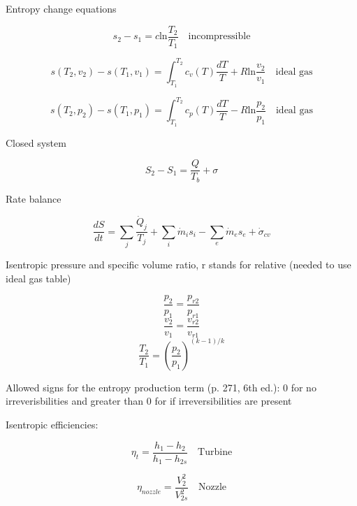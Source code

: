 \documentclass[paper=letter, fontsize=11pt]{scrartcl}
\numberwithin{equation}{section}        %
\numberwithin{figure}{section}          %
\numberwithin{table}{section}               %
\begin{document}
Entropy change equations

\begin{equation}
    s_2-s_1 = c \text{ln}\frac{T_2}{T_1}\quad\text{incompressible}
\end{equation}

\begin{equation}
    s(T_2,v_2)-s(T_1,v_1) = \int_{T_1}^{T_2}c_v(T)\frac{dT}{T} + R \text{ln}\frac{v_2}{v_1}  \quad\text{ideal gas}
\end{equation}

\begin{equation}
    s(T_2,p_2)-s(T_1,p_1) = \int_{T_1}^{T_2}c_p(T)\frac{dT}{T} - R \text{ln}\frac{p_2}{p_1}  \quad\text{ideal gas}
\end{equation}

Closed system

\begin{equation}
    S_2-S_1 = \frac{Q}{T_b}+\sigma
\end{equation}

Rate balance

\begin{equation}
    \frac{dS}{dt} = \sum_j \frac{\dot Q_j}{T_j} + \sum_i \dot m_i s_i - \sum_e \dot m_e s_e +\dot\sigma_{cv}
\end{equation}

Isentropic pressure and specific volume ratio, r stands for relative (needed to use ideal gas table)

\begin{equation}
    \frac{p_2}{p_1}=\frac{p_{r2}}{p_{r1}}
\end{equation}
\begin{equation}
    \frac{v_2}{v_1}=\frac{v_{r2}}{v_{r1}}
\end{equation}
\begin{equation}
    \frac{T_2}{T_1} = \left(\frac{p_2}{p_1}\right)^{(k-1)/k}
\end{equation}

Allowed signs for the entropy production term (p. 271, 6th ed.): 0 for no irreverisbilities and greater than 0 for if irreversibilities are present

Isentropic efficiencies:

\begin{equation}
    \eta_t = \frac{h_1 - h_2}{h_1 - h_{2s}}\quad\text{Turbine}
\end{equation}

\begin{equation}
    \eta_{nozzle} = \frac{V_2^2}{V_{2s}^2}\quad\text{Nozzle}
\end{equation}
\end{document}
